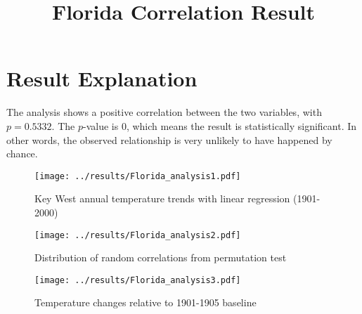 \documentclass[conference]{IEEEtran}
\title{Florida Correlation Result}
\author{}
\date{}
\begin{document}
\maketitle

\section*{Result Explanation}

The analysis shows a positive correlation between the two variables, with $p = 0.5332$.
The $p$-value is $0$, which means the result is statistically significant.
In other words, the observed relationship is very unlikely to have happened by chance.

\begin{figure}[]
  \centering
  \texttt{[image: ../results/Florida\_analysis1.pdf]}
  \caption{Key West annual temperature trends with linear regression (1901-2000)}
\end{figure}


\begin{figure}[h!]
  \centering
  \texttt{[image: ../results/Florida\_analysis2.pdf]}
  \caption{Distribution of random correlations from permutation test}
\end{figure}


\begin{figure}[h!]
  \centering
  \texttt{[image: ../results/Florida\_analysis3.pdf]}
  \caption{Temperature changes relative to 1901-1905 baseline}
\end{figure}
\end{document}
